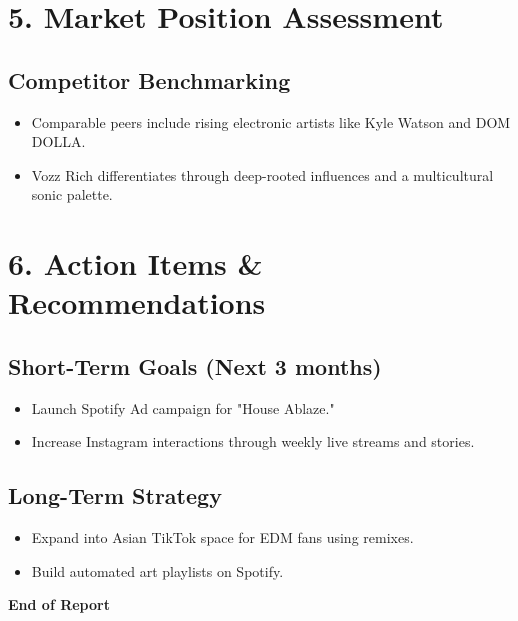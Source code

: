 \documentclass[a4paper,12pt]{article}
\begin{document}
\vspace{1cm}

\section*{5. Market Position Assessment}
\subsection*{Competitor Benchmarking}
\begin{itemize}
    \item Comparable peers include rising electronic artists like Kyle Watson and DOM DOLLA.
    \item Vozz Rich differentiates through deep-rooted influences and a multicultural sonic palette.
\end{itemize}

\vspace{1cm}

\section*{6. Action Items \& Recommendations}
\subsection*{Short-Term Goals (Next 3 months)}
\begin{itemize}
    \item Launch Spotify Ad campaign for "House Ablaze."
    \item Increase Instagram interactions through weekly live streams and stories.
\end{itemize}

\subsection*{Long-Term Strategy}
\begin{itemize}
    \item Expand into Asian TikTok space for EDM fans using remixes.
    \item Build automated art playlists on Spotify.
\end{itemize}

\vspace{2cm}

\begin{center}
\textbf{\Huge End of Report}
\end{center}
\end{document}
